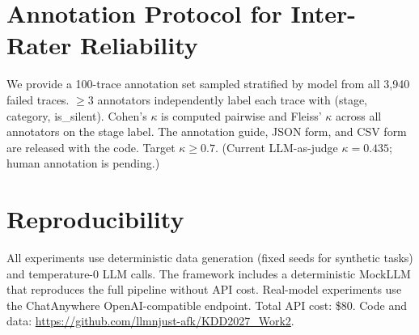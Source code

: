 \section{Annotation Protocol for Inter-Rater Reliability}
\label{app:annotation}

We provide a 100-trace annotation set sampled stratified by model from all 3{,}940 failed traces. $\geq 3$ annotators independently label each trace with (stage, category, is\_silent). Cohen's $\kappa$ is computed pairwise and Fleiss' $\kappa$ across all annotators on the stage label. The annotation guide, JSON form, and CSV form are released with the code. Target $\kappa \geq 0.7$. (Current LLM-as-judge $\kappa = 0.435$; human annotation is pending.)

\section{Reproducibility}
\label{app:repro}

All experiments use deterministic data generation (fixed seeds for synthetic tasks) and temperature-0 LLM calls. The framework includes a deterministic MockLLM that reproduces the full pipeline without API cost. Real-model experiments use the ChatAnywhere OpenAI-compatible endpoint. Total API cost: \$80. Code and data: \url{https://github.com/llmnjust-afk/KDD2027_Work2}.
